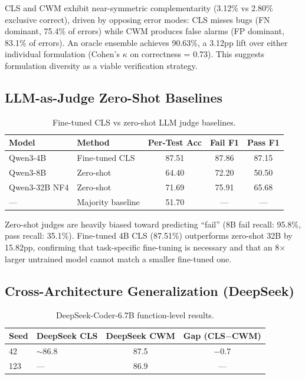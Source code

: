 \documentclass[11pt,a4paper]{article}
\begin{document}
CLS and CWM exhibit near-symmetric complementarity (3.12\% vs 2.80\% exclusive correct), driven by opposing error modes: CLS misses bugs (FN dominant, 75.4\% of errors) while CWM produces false alarms (FP dominant, 83.1\% of errors). An oracle ensemble achieves 90.63\%, a 3.12pp lift over either individual formulation (Cohen's $\kappa$ on correctness = 0.73). This suggests formulation diversity as a viable verification strategy.

\subsection{LLM-as-Judge Zero-Shot Baselines}
\label{sec:zeroshot}

\begin{table}[h]
\centering
\caption{Fine-tuned CLS vs zero-shot LLM judge baselines.}
\label{tab:judge}
\begin{tabular}{llccc}
\toprule
Model & Method & Per-Test Acc & Fail F1 & Pass F1 \\
\midrule
Qwen3-4B & Fine-tuned CLS & 87.51 & 87.86 & 87.15 \\
Qwen3-8B & Zero-shot & 64.40 & 72.20 & 50.50 \\
Qwen3-32B NF4 & Zero-shot & 71.69 & 75.91 & 65.68 \\
--- & Majority baseline & 51.70 & --- & --- \\
\bottomrule
\end{tabular}
\end{table}

Zero-shot judges are heavily biased toward predicting ``fail'' (8B fail recall: 95.8\%, pass recall: 35.1\%). Fine-tuned 4B CLS (87.51\%) outperforms zero-shot 32B by 15.82pp, confirming that task-specific fine-tuning is necessary and that an 8$\times$ larger untrained model cannot match a smaller fine-tuned one.

\subsection{Cross-Architecture Generalization (DeepSeek)}
\label{sec:deepseek}

\begin{table}[h]
\centering
\caption{DeepSeek-Coder-6.7B function-level results.}
\label{tab:deepseek}
\begin{tabular}{llcc}
\toprule
Seed & DeepSeek CLS & DeepSeek CWM & Gap (CLS$-$CWM) \\
\midrule
42  & $\sim$86.8 & 87.5 & $-$0.7 \\
123 & --- & 86.9 & --- \\
\bottomrule
\end{tabular}
\end{table}
\end{document}
